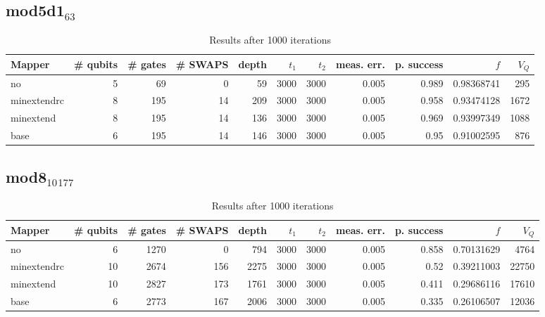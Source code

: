 \documentclass[11pt]{article}
\begin{document}
\subsection{mod5d1\(_{\text{63}}\)}
\label{sec:org65dfff8}
\begin{table}[!htpb]
\caption{\label{tab:orgd94b06a}
Results after 1000 iterations}
\centering
\begin{tabular}{lrrrrrrrrrr}
\hline
Mapper & \# qubits & \# gates & \# SWAPS & depth & \(t_1\) & \(t_2\) & meas. err. & p. success & \(f\) & \(V_Q\)\\
\hline
no & 5 & 69 & 0 & 59 & 3000 & 3000 & 0.005 & 0.989 & 0.98368741 & 295\\
\hline
minextendrc & 8 & 195 & 14 & 209 & 3000 & 3000 & 0.005 & 0.958 & 0.93474128 & 1672\\
minextend & 8 & 195 & 14 & 136 & 3000 & 3000 & 0.005 & 0.969 & 0.93997349 & 1088\\
base & 6 & 195 & 14 & 146 & 3000 & 3000 & 0.005 & 0.95 & 0.91002595 & 876\\
\hline
\end{tabular}
\end{table}
\subsection{mod8\(_{\text{10}}\)\(_{\text{177}}\)}
\label{sec:org722d67b}
\begin{table}[!htpb]
\caption{\label{tab:org66aec26}
Results after 1000 iterations}
\centering
\begin{tabular}{lrrrrrrrrrr}
\hline
Mapper & \# qubits & \# gates & \# SWAPS & depth & \(t_1\) & \(t_2\) & meas. err. & p. success & \(f\) & \(V_Q\)\\
\hline
no & 6 & 1270 & 0 & 794 & 3000 & 3000 & 0.005 & 0.858 & 0.70131629 & 4764\\
\hline
minextendrc & 10 & 2674 & 156 & 2275 & 3000 & 3000 & 0.005 & 0.52 & 0.39211003 & 22750\\
minextend & 10 & 2827 & 173 & 1761 & 3000 & 3000 & 0.005 & 0.411 & 0.29686116 & 17610\\
base & 6 & 2773 & 167 & 2006 & 3000 & 3000 & 0.005 & 0.335 & 0.26106507 & 12036\\
\hline
\end{tabular}
\end{table}
\end{document}
